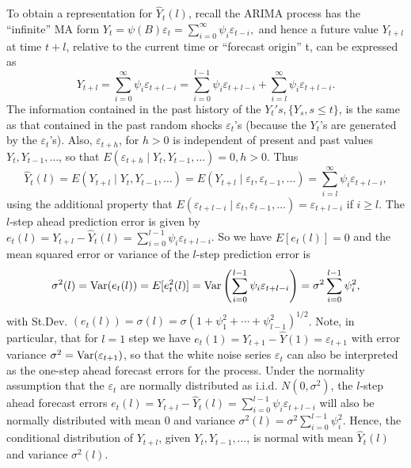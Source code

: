 To obtain a representation for $\hat{Y}_t(l)$, recall the ARIMA process has the ``infinite'' MA form $Y_t = \psi(B) \varepsilon_t = \sum_{i=0}^{\infty}\psi_i \varepsilon_{t-i},$ and hence a future value $Y_{t+l}$ at time $t+l$, relative to the current time or ``forecast origin'' t, can be expressed as
	\begin{equation} \label{eqn:2ytl}
	Y_{t+l} = \sum_{i=0}^\infty \psi_i \varepsilon_{t+l-i} = \sum_{i=0}^{l-1} \psi_i \varepsilon_{t+l-i} + \sum_{i=l}^\infty \psi_i \varepsilon_{t+l-i}.
	\end{equation}
The information contained in the past history of the $Y_t's, \{ Y_s, s \leq t \}$, is the same as that contained in the past random shocks $\varepsilon_t$'s (because the $Y_t$'s are generated by the $\varepsilon_t$'s). Also, $\varepsilon_{t+h}$, for $h > 0$ is independent of present and past values $Y_{t}, Y_{t-1}, \ldots$, so that $E(\varepsilon_{t+h} \;|\; Y_t,Y_{t-1},\ldots) = 0, h>0$. Thus
	\begin{equation} \label{eqn:2yhatt}
	\hat{Y}_t(l) = E(Y_{t+l} \;|\; Y_t,Y_{t-1},\ldots) = E(Y_{t+l} \;|\; \varepsilon_t, \varepsilon_{t-1}, \ldots) = \sum_{i=l}^\infty \psi_i \varepsilon_{t+l-i},
	\end{equation}
using the additional property that $E(\varepsilon_{t+l-i} \;|\; \varepsilon_t,  \varepsilon_{t-1}, \ldots) = \varepsilon_{t+l-i}$ if $i \geq l$. The $l$-step ahead prediction error is given by $e_t(l) = Y_{t+l} - \hat{Y}_t(l) = \sum_{i=0}^{l-1} \psi_i \varepsilon_{t+l-i}$. So we have $E[e_t(l)]=0$ and the mean squared error or variance of the $l$-step prediction error is
	\begin{equation} \label{eqn:2sigmasq}
	\sigma^2(l) = \var(e_t(l)) = E[e_t^2(l)] = \var \left(\sum_{i=0}^{l-1} \psi_i \varepsilon_{t+l-i} \right) = \sigma^2 \sum_{i=0}^{l-1} \psi_i^2,
	\end{equation}
with St.Dev. $(e_t(l)) = \sigma(l) = \sigma(1 + \psi_1^2 + \cdots + \psi_{l-1}^2)^{1/2}$. Note, in particular, that for $l = 1$ step we have $e_t(1) = Y_{t+1} - \hat{Y}(1) = \varepsilon_{t+1}$ with error variance $\sigma^2 = \operatorname{Var}(\varepsilon_{t+1})$, so that the white noise series $\varepsilon_t$ can also be interpreted as the one-step ahead forecast errors for the process. Under the normality assumption that the $\varepsilon_t$ are normally distributed as i.i.d. $N(0, \sigma^2)$, the $l$-step ahead forecast errors $e_t(l) = Y_{t+l} - \hat{Y}_t(l) = \sum_{i=0}^{l-1} \psi_i \varepsilon_{t+l-i}$ will also be normally distributed with mean 0 and variance $\sigma^2(l) = \sigma^2 \sum_{i=0}^{l-1} \psi_i^2$. Hence, the conditional distribution of $Y_{t+l}$, given $Y_t,Y_{t-1}, \ldots$, is normal with mean $\hat{Y}_t(l)$ and variance $\sigma^2(l)$.


